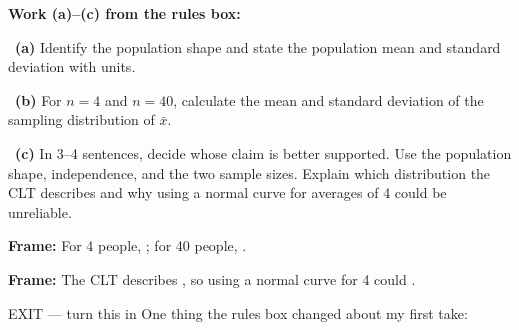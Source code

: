 \documentclass[11pt]{article}
\begin{document}
\newpage
\textbf{Work (a)--(c) from the rules box:}\par\smallskip

~\textbf{(a)} Identify the population shape and state the population mean and standard deviation with units.\par
\workspace{0.7in}

~\textbf{(b)} For $n=4$ and $n=40$, calculate the mean and standard deviation of the sampling distribution of $\bar{x}$.\par
\workspace{1.4in}

~\textbf{(c)} In 3--4 sentences, decide whose claim is better supported. Use the population shape, independence, and the two sample sizes. Explain which distribution the CLT describes and why using a normal curve for averages of 4 could be unreliable.\par
\workspace{2.0in}

\begin{sentenceframebox}\raggedright\textbf{Frame:} For 4 people, \blank[2.5in]; for 40 people, \blank[2.5in].\end{sentenceframebox}

\begin{sentenceframebox}\raggedright\textbf{Frame:} The CLT describes \blank[2.2in], so using a normal curve for 4 could \blank[2.2in].\end{sentenceframebox}

\begin{summaryexitbox}{EXIT --- turn this in}
One thing the rules box changed about my first take: \hrulefill\par
\workspace{0.4in}
\end{summaryexitbox}
\end{document}
